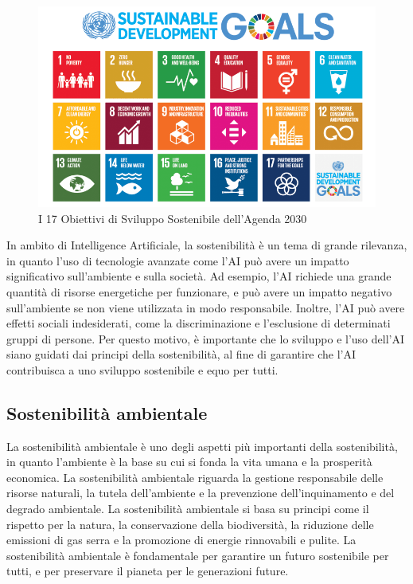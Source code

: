\begin{figure}[H]
    \centering
    \includegraphics[scale=0.5]{images/sdg.png}
\caption{I 17 Obiettivi di Sviluppo Sostenibile dell'Agenda 2030}
\end{figure}
\noindent In ambito di Intelligence Artificiale, la sostenibilità è un tema di grande rilevanza, in quanto l'uso di tecnologie avanzate come l'AI può avere un impatto significativo sull'ambiente e sulla società. Ad esempio, l'AI richiede una grande quantità di risorse energetiche per funzionare, e può avere un impatto negativo sull'ambiente se non viene utilizzata in modo responsabile. Inoltre, l'AI può avere effetti sociali indesiderati, come la discriminazione e l'esclusione di determinati gruppi di persone. Per questo motivo, è importante che lo sviluppo e l'uso dell'AI siano guidati dai principi della sostenibilità, al fine di garantire che l'AI contribuisca a uno sviluppo sostenibile e equo per tutti.


\subsection{Sostenibilità ambientale}
La sostenibilità ambientale è uno degli aspetti più importanti della sostenibilità, in quanto l'ambiente è la base su cui si fonda la vita umana e la prosperità economica. La sostenibilità ambientale riguarda la gestione responsabile delle risorse naturali, la tutela dell'ambiente e la prevenzione dell'inquinamento e del degrado ambientale. La sostenibilità ambientale si basa su principi come il rispetto per la natura, la conservazione della biodiversità, la riduzione delle emissioni di gas serra e la promozione di energie rinnovabili e pulite. La sostenibilità ambientale è fondamentale per garantire un futuro sostenibile per tutti, e per preservare il pianeta per le generazioni future.


